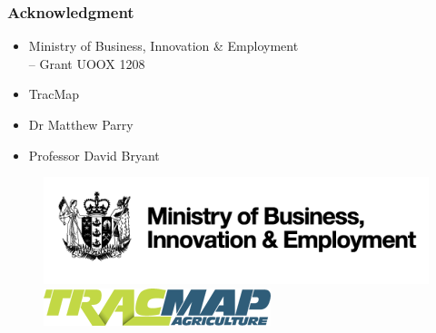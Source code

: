\documentclass{beamer}
\begin{document}

\begin{frame}
\frametitle{Acknowledgment}
\begin{itemize}
\item Ministry of Business, Innovation \& Employment\\
 \hskip 0.5cm -- Grant UOOX 1208\\
\item TracMap\\
\item Dr Matthew Parry\\
\item Professor David Bryant
\end{itemize}
\end{frame}


\begin{frame}
\begin{figure}
\centering
\includegraphics[]{plots/mbie}\\
\includegraphics[]{plots/tracmap-agriculture}
\centering
\end{figure}
\end{frame}

\end{document}
